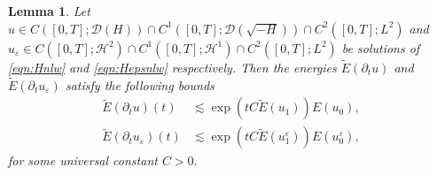 \documentclass[11pt, oneside]{article}   	%
\newtheorem{lemma}[theorem]{Lemma}
\newcommand{\ssp}{\mathscr{H}}
\begin{document}
\begin{lemma}
	Let $u\in C([0,T];\mathscr{D}(H))\cap C^1([0,T];\mathscr{D}(\sqrt{-H}))\cap C^2([0,T];L^2)$ and $u_\varepsilon\in C([0,T];\ssp^2)\cap C^1([0,T];\ssp^1)\cap C^2([0,T];L^2)$ be solutions of \eqref{eqn:Hnlw} and \eqref{eqn:Hepsnlw} respectively. Then the energies $\tilde{E} (\partial_t u)$ and $\tilde{E} (\partial_t u_{\varepsilon})$ satisfy the following
	bounds
	\begin{align*}
	\tilde{E} (\partial_t u) (t) & \lesssim \exp (tC
	\tilde{E} (u_1)) E (u_0), \\
	\tilde{E} (\partial_t u_{\varepsilon}) (t) &\lesssim \exp (tC
	\tilde{E} (u^{\varepsilon}_1)) E (u^{\varepsilon}_0) ,
	\end{align*}
for some universal constant $C > 0.$

\end{lemma}
\end{document}
